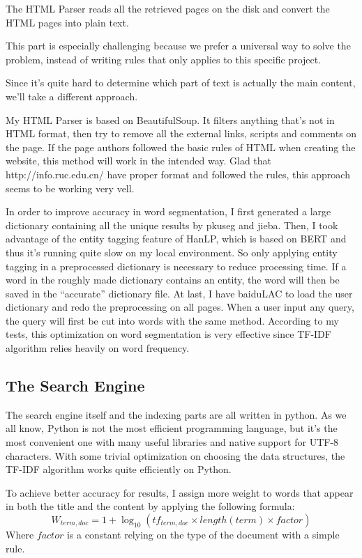 \documentclass[a4paper]{article}
\begin{document}
The HTML Parser reads all the retrieved pages on the disk and convert the HTML pages into plain text.

This part is especially challenging because we prefer a universal way to solve the problem, instead of writing rules that only applies to this specific project.

Since it's quite hard to determine which part of text is actually the main content, we'll take a different approach. 

My HTML Parser is based on BeautifulSoup. It filters anything that's not in HTML format, then try to remove all the external links, scripts and comments on the page. If the page authors followed the basic rules of HTML when creating the website, this method will work in the intended way. Glad that http://info.ruc.edu.cn/ have proper format and followed the rules, this approach seems to be working very vell.

In order to improve accuracy in word segmentation, I first generated a large dictionary containing all the unique results by pkuseg and jieba. Then, I took advantage of the entity tagging feature of HanLP, which is based on BERT and thus it's running quite slow on my local environment. So only applying entity tagging in a preprocessed dictionary is necessary to reduce processing time. If a word in the roughly made dictionary contains an entity, the word will then be saved in the ``accurate'' dictionary file. At last, I have baiduLAC to load the user dictionary and redo the preprocessing on all pages. When a user input any query, the query will first be cut into words with the same method. According to my tests, this optimization on word segmentation is very effective since TF-IDF algorithm relies heavily on word frequency.

\subsection{The Search Engine}

The search engine itself and the indexing parts are all written in python. As we all know, Python is not the most efficient programming language, but it's the most convenient one with many useful libraries and native support for UTF-8 characters. With some trivial optimization on choosing the data structures, the TF-IDF algorithm works quite efficiently on Python.

To achieve better accuracy for results, I assign more weight to words that appear in both the title and the content by applying the following formula:
$$W_{term, doc} = 1 + \log_{10}(tf_{term, doc}\times length(term)\times factor)$$
Where $factor$ is a constant relying on the type of the document with a simple rule.
\end{document}
